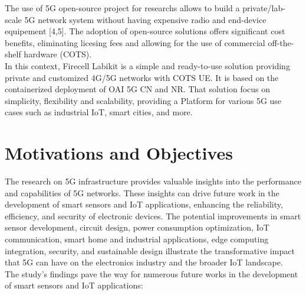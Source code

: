 \documentclass{report}
\begin{document}
The use of 5G open-source project for researchs allows to build a private/lab-scale 5G network system without having expensive radio and end-device equipement [4,5]. The adoption of open-source solutions offers significant cost benefits, eliminating licesing fees and allowing for the use of commercial off-the-shelf hardware (COTS).\\
In this context, Firecell Labikit is a simple and ready-to-use solution providing private and customized 4G/5G networks with COTS UE. It is based on the containerized deployment of OAI 5G CN and NR. That solution focus on simplicity, flexibility and scalability, providing a Platform for various 5G use cases such as industrial IoT, smart cities, and more. 
\chapter{Motivations and Objectives}
The research on 5G infrastructure provides valuable insights into the performance and capabilities of 5G networks. These insights can drive future work in the development of smart sensors and IoT applications, enhancing the reliability, efficiency, and security of electronic devices. The potential improvements in smart sensor development, circuit design, power consumption optimization, IoT communication, smart home and industrial applications, edge computing integration, security, and sustainable design illustrate the transformative impact that 5G can have on the electronics industry and the broader IoT landscape.\\
The study’s findings pave the way for numerous future works in the development of smart sensors and IoT applications:
\end{document}
